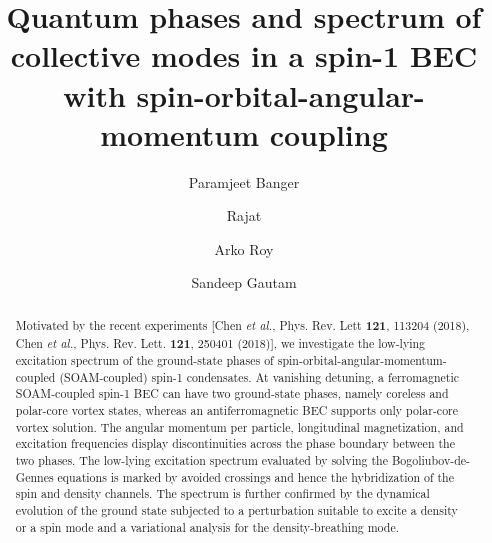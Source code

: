 \documentclass[pra,twocolumn,aps,superscriptaddress,showpacs,longbibliography]{revtex4-1}
\begin{document}
\title{%
Quantum phases and spectrum of collective modes in a spin-1 BEC with spin-orbital-angular-momentum coupling}
\author{Paramjeet Banger}
\author{Rajat} 
\author{Arko Roy}
\author{Sandeep Gautam}

\begin{abstract}
Motivated by the recent experiments [Chen {\em et al.}, Phys. Rev. Lett {\bf 121}, 113204 (2018), 
Chen {\em et al.}, Phys. Rev. Lett. {\bf 121}, 250401 (2018)], we investigate the low-lying excitation spectrum of the ground-state
phases of spin-orbital-angular-momentum-coupled (SOAM-coupled) spin-1 condensates. At vanishing detuning, a ferromagnetic SOAM-coupled 
spin-1 BEC can have two ground-state phases, namely coreless and polar-core vortex states, whereas an antiferromagnetic
BEC supports only polar-core vortex solution. The angular momentum per particle, longitudinal magnetization, and excitation frequencies 
display discontinuities across the phase boundary between the two phases. The low-lying excitation spectrum evaluated by solving
the Bogoliubov-de-Gennes equations is marked by avoided crossings and hence the hybridization of the spin and density 
channels. The spectrum is further confirmed by the dynamical evolution of the ground state subjected to a perturbation suitable
to excite a density or a spin mode and a variational analysis for the density-breathing mode.   

\end{abstract}
\maketitle
\end{document}
